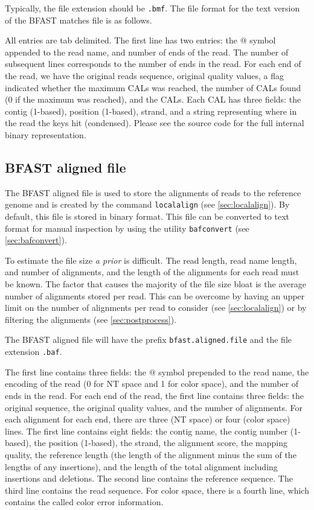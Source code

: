 \documentclass[a4paper,12pt]{book}
\newcommand{\TT}[1]{{\tt #1}} %
\newcommand{\IF}[1]{{\it #1}} %
\newcommand{\BMF}{BFAST matches file} %
\newcommand{\BAF}{BFAST aligned file} %
\begin{document}
Typically, the file extension should be \TT{.bmf}.
The file format for the text version of the \BMF{} is as follows.

All entries are tab delimited.
The first line has two entries: the @ symbol appended to the read name, and number of ends of the read.
The number of subsequent lines corresponds to the number of ends in the read.
For each end of the read, we have the original reads sequence, original quality values, a flag indicated whether the maximum CALs was reached, the number of CALs found (0 if the maximum was reached), and the CALs.
Each CAL has three fields: the contig (1-based), position (1-based), strand, and a string representing where in the read the keys hit (condensed).
Please see the source code for the full internal binary representation.

\subsection{\BAF{}}
\label{sec:baf} 
The \BAF{} is used to store the alignments of reads to the reference genome and is created by the command \TT{localalign} (see \autoref{sec:localalign}).
By default, this file is stored in binary format.
This file can be converted to text format for manual inspection by using the utility \TT{bafconvert} (see \autoref{sec:bafconvert}).

To estimate the file size \IF{a prior} is difficult.
The read length, read name length, and number of alignments, and the length of the alignments for each read must be known.
The factor that causes the majority of the file size bloat is the average number of alignments stored per read.
This can be overcome by having an upper limit on the number of alignments per read to consider (see \autoref{sec:localalign}) or by filtering the alignments (see \autoref{sec:postprocess}).

The \BAF{} will have the prefix \TT{bfast.aligned.file} and the file extension \TT{.baf}.

The first line contains three fields: the @ symbol prepended to the read name, the encoding of the read (0 for NT space and 1 for color space), and the number of ends in the read.
For each end of the read, the first line contains three fields: the original sequence, the original quality values, and the number of alignments.
For each alignment for each end, there are three (NT space) or four (color space) lines.
The first line contains eight fields: the contig name, the contig number (1-based), the position (1-based), the strand, the alignment score, the mapping quality, the reference length (the length of the alignment minus the sum of the lengths of any insertions), and the length of the total alignment including insertions and deletions.
The second line contains the reference sequence.
The third line contains the read sequence.
For color space, there is a fourth line, which contains the called color error information.
\end{document}
